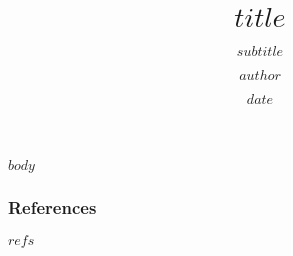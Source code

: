 \documentclass{beamer}
\title{$title$}
\subtitle{$subtitle$}
\author{$author$}
\date{$date$}
\begin{document}
\maketitle

$body$

\begin{frame}[allowframebreaks]
    \frametitle{References}
	$refs$
\end{frame}
\end{document}
